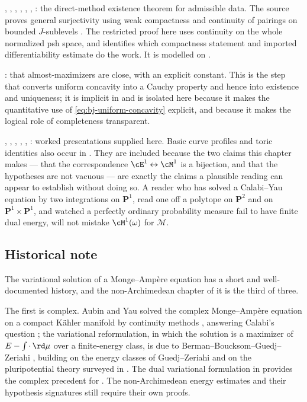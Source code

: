 , ,
, ,
,
,
: the direct-method existence theorem for
admissible data. The source proves general surjectivity using weak
compactness and continuity of pairings on bounded $J$-sublevels
\cite[Proposition~9.19 and Theorem~12.8]{BJ22}. The restricted proof here
uses continuity on the whole normalized psh space, and identifies which
compactness statement and imported differentiability estimate do the work.  It is modelled on
.

: that almost-maximizers are close, with
an explicit constant.  This is the step that converts uniform concavity
into a Cauchy property and hence into existence and uniqueness; it is
implicit in \cite[\S12]{BJ22} and is isolated here because it makes the quantitative use of \eqref{eq:bj-uniform-concavity} explicit, and because it makes
the logical role of completeness transparent.

,
,
,
,
,
: worked presentations supplied here. Basic curve profiles and toric
identities also occur in \cite{BJ22}. They are included because the two claims
this chapter makes --- that the correspondence
$\cE^1\leftrightarrow\cM^1$ is a bijection, and that the hypotheses are
not vacuous --- are exactly the claims a plausible reading can appear to
establish without doing so.  A reader who has solved a Calabi--Yau equation
by two integrations on $\mathbf P^1$, read one off a polytope on
$\mathbf P^2$ and on $\mathbf P^1\times\mathbf P^1$, and watched a
perfectly ordinary probability measure fail to have finite dual energy,
will not mistake $\cM^1(\omega)$ for $\mathcal M$.

\subsection{Historical note}
\label{sec:ch47-history}

The variational solution of a Monge--Amp\`ere equation has a short and
well-documented history, and the non-Archimedean chapter of it is the third
of three.

The first is complex.  Aubin and Yau solved the complex Monge--Amp\`ere
equation on a compact Kähler manifold by continuity methods
\cite{Aub84,Y78}, answering Calabi's question \cite{Cal57}; the variational
reformulation, in which the solution is a maximizer of
$E-\int\cdot\,\rd\mu$ over a finite-energy class, is due to
Berman--Boucksom--Guedj--Zeriahi \cite{BBGZ13}, building on the energy
classes of Guedj--Zeriahi \cite{GZ07} and on the pluripotential theory
surveyed in \cite{GZ17}.  The dual variational formulation in \cite{BBGZ13} provides the complex
precedent for . The
non-Archimedean energy estimates and their hypothesis signatures still
require their own proofs.

